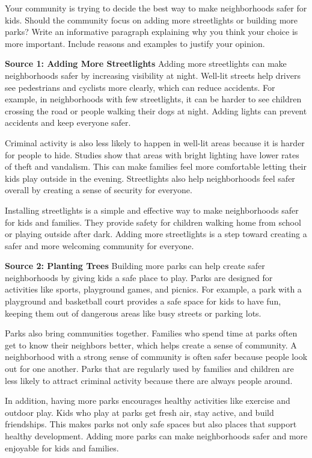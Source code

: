 \documentclass[12pt]{article}
\begin{document}
\begin{tcolorbox}[colframe=black!60, colback=white, 
coltitle=black, colbacktitle=black!15, fonttitle=\bfseries\Large, 
title=Independent Practice Prompt, halign title=center, left=10pt, right=10pt, top=10pt, bottom=15pt]
Your community is trying to decide the best way to make neighborhoods safer for kids. Should the community focus on adding more streetlights or building more parks?
 Write an informative paragraph explaining why you think your choice is more important. Include reasons and examples to justify your opinion.


\vspace{1em}

\textbf{Source 1: Adding More Streetlights}
Adding more streetlights can make neighborhoods safer by increasing visibility at night. Well-lit streets help drivers see pedestrians and cyclists more clearly, which can reduce accidents. For example, in neighborhoods with few streetlights, it can be harder to see children crossing the road or people walking their dogs at night. Adding lights can prevent accidents and keep everyone safer.

Criminal activity is also less likely to happen in well-lit areas because it is harder for people to hide. Studies show that areas with bright lighting have lower rates of theft and vandalism. This can make families feel more comfortable letting their kids play outside in the evening. Streetlights also help neighborhoods feel safer overall by creating a sense of security for everyone.

Installing streetlights is a simple and effective way to make neighborhoods safer for kids and families. They provide safety for children walking home from school or playing outside after dark. Adding more streetlights is a step toward creating a safer and more welcoming community for everyone.

\vspace{1em}

\textbf{Source 2: Planting Trees}
Building more parks can help create safer neighborhoods by giving kids a safe place to play. Parks are designed for activities like sports, playground games, and picnics. For example, a park with a playground and basketball court provides a safe space for kids to have fun, keeping them out of dangerous areas like busy streets or parking lots.

Parks also bring communities together. Families who spend time at parks often get to know their neighbors better, which helps create a sense of community. A neighborhood with a strong sense of community is often safer because people look out for one another. Parks that are regularly used by families and children are less likely to attract criminal activity because there are always people around.

In addition, having more parks encourages healthy activities like exercise and outdoor play. Kids who play at parks get fresh air, stay active, and build friendships. This makes parks not only safe spaces but also places that support healthy development. Adding more parks can make neighborhoods safer and more enjoyable for kids and families.
\end{tcolorbox}
\end{document}
